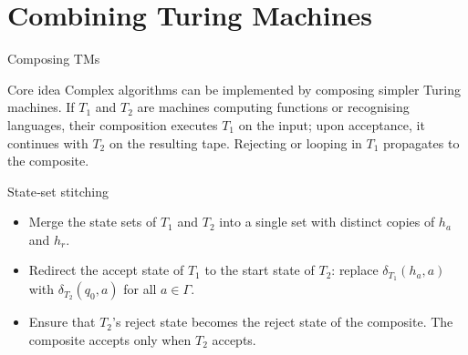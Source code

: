 %

\section{Combining Turing Machines}

\begin{frame}[t]{Composing TMs}
  \begin{tblock}{Core idea}
    Complex algorithms can be implemented by composing simpler Turing
    machines.  If $T_1$ and $T_2$ are machines computing functions or
    recognising languages, their composition executes $T_1$ on the
    input; upon acceptance, it continues with $T_2$ on the resulting
    tape.  Rejecting or looping in $T_1$ propagates to the composite.
  \end{tblock}
  \begin{tblock}{State‑set stitching}
    \begin{itemize}
      \item Merge the state sets of $T_1$ and $T_2$ into a single set
        with distinct copies of $h_a$ and $h_r$.
      \item Redirect the accept state of $T_1$ to the start state of
        $T_2$: replace $\delta_{T_1}(h_a,a)$ with $\delta_{T_2}(q_0,a)$
        for all $a\in \Gamma$.
      \item Ensure that $T_2$’s reject state becomes the reject state
        of the composite.  The composite accepts only when $T_2$ accepts.
    \end{itemize}
  \end{tblock}
  \label{fr:7.4-01}
\end{frame}

